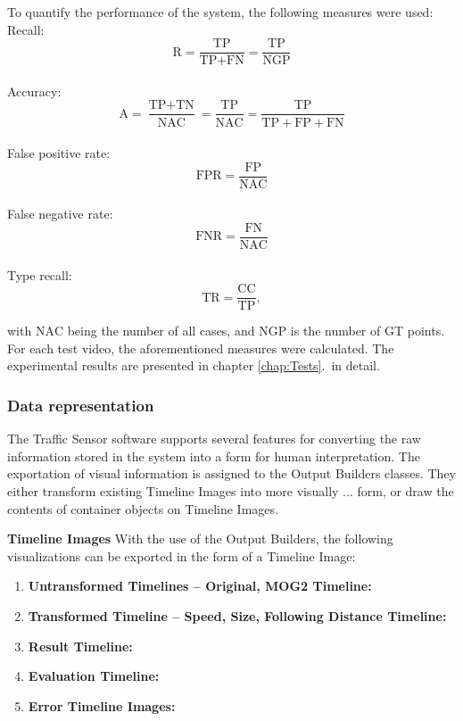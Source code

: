 To quantify the performance of the system, the following measures were used:
\\[5pt]
\noindent Recall:
\begin{displaymath}
\text{R} = \frac{\text{TP}}{\text{TP}+\text{FN}} = \frac{\text{TP}}{\text{NGP}}
\end{displaymath}
\\[5pt]
\noindent Accuracy:
\begin{displaymath}
\text{A} = \frac{\text{TP}+\text{TN}}{\text{NAC}} = \frac{\text{TP}}{\text{NAC}} = \frac{\text{TP}}{\text{TP}+\text{FP}+\text{FN}}
\end{displaymath}
\\[5pt]
\noindent False positive rate:
\begin{displaymath}
\text{FPR} = \frac{\text{FP}}{\text{NAC}}
\end{displaymath}
\\[5pt]
\noindent False negative rate:
\begin{displaymath}
\text{FNR} = \frac{\text{FN}}{\text{NAC}}
\end{displaymath}
\\[5pt]
\noindent Type recall:
\begin{displaymath}
\text{TR} = \frac{\text{CC}}{\text{TP}},
\end{displaymath}

with $\text{NAC}$ being the number of all cases, and $\text{NGP}$ is the number of GT points.
For each test video, the aforementioned measures were calculated.
The experimental results are presented in chapter \ref{chap:Tests}.~in detail.
\subsubsection{Data representation}
The Traffic Sensor software supports several features for converting the raw information stored in the system into a form for human interpretation.
The exportation of visual information is assigned to the Output Builders classes.
They either transform existing Timeline Images into more visually ... form, or draw the contents of container objects on Timeline Images.

\textbf{Timeline Images}
With the use of the Output Builders, the following visualizations can be exported in the form of a Timeline Image:
\begin{enumerate}
	\item \textbf{Untransformed Timelines -- Original, MOG2 Timeline: }
	\item \textbf{Transformed Timeline -- Speed, Size, Following Distance Timeline: }
	\item \textbf{Result Timeline: }
	\item \textbf{Evaluation Timeline: }
	\item \textbf{Error Timeline Images: }
\end{enumerate} 

